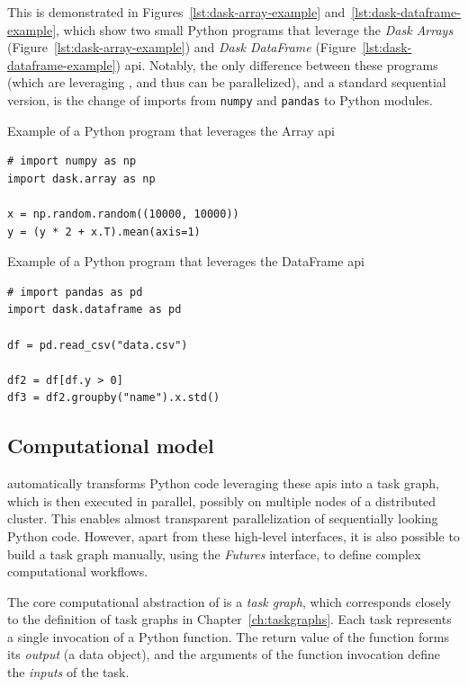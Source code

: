 This is demonstrated in Figures~\ref{lst:dask-array-example} and~\ref{lst:dask-dataframe-example}, which
show two small Python programs that leverage the \emph{Dask Arrays} (Figure~\ref{lst:dask-array-example}) and
\emph{Dask DataFrame}
(Figure~\ref{lst:dask-dataframe-example}) \gls{api}. Notably, the only difference between these
programs (which are leveraging \dask{}, and thus can be parallelized), and a
standard sequential version, is the change of imports from \texttt{numpy} and
\texttt{pandas} to \dask{} Python modules.

\begin{listing}[h]
	\caption{Example of a Python program that leverages the \dask{} Array
	\gls{api}}
	\label{lst:dask-array-example}
	\begin{verbatim}
# import numpy as np
import dask.array as np

x = np.random.random((10000, 10000))
y = (y * 2 + x.T).mean(axis=1)
	\end{verbatim}
\end{listing}

\begin{listing}[h]
	\caption{Example of a Python program that leverages the \dask{} DataFrame
	\gls{api}}
	\label{lst:dask-dataframe-example}
	\begin{verbatim}
# import pandas as pd
import dask.dataframe as pd

df = pd.read_csv("data.csv")

df2 = df[df.y > 0]
df3 = df2.groupby("name").x.std()
	\end{verbatim}
\end{listing}

\subsection*{Computational model}
\dask{} automatically transforms Python code leveraging these
\glspl{api} into a task
graph, which is then executed in parallel, possibly on multiple nodes of a distributed cluster.
This enables almost transparent parallelization of sequentially looking Python code. However, apart
from these high-level interfaces, it is also possible to build a task graph manually, using the
\emph{Futures} interface, to define complex computational workflows.

The core computational abstraction of \dask{} is a \emph{task graph},
which corresponds closely to the definition of task graphs in Chapter~\ref{ch:taskgraphs}.
Each task represents a single invocation of a Python function. The return value of the function
forms its \emph{output} (a data object), and the arguments of the function invocation define the
\emph{inputs} of the task.

